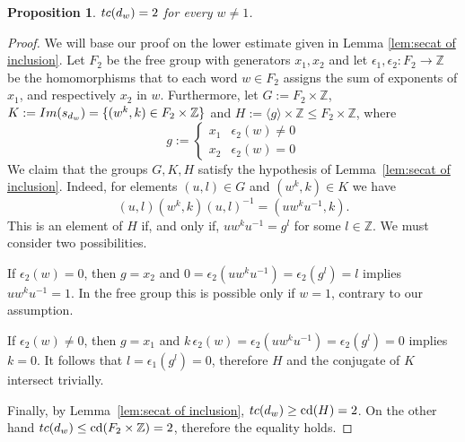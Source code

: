 \documentclass[10pt,a4paper]{amsart}
\newtheorem{proposition}{Proposition}
\newcommand{\ZZ}{{\mathbb{Z}}}
\newcommand{\cd}{\mathrm{cd}}
\newcommand{\im}{\mathop{\rm Im}\nolimits}
\newcommand{\tc}{\mathop{\rm tc}\nolimits}
\begin{document}
\begin{proposition}\label{prop:ex free by Z}
$\tc(d_w)=2$ for every $w\ne 1$.
\end{proposition}

\begin{proof}
We will base our proof on the lower estimate given in Lemma \ref{lem:secat of inclusion}.
Let $F_2$ be the free group with generators $x_1,x_2$ and let 
$\epsilon_1,\epsilon_2\colon F_2\to\ZZ$ be the homomorphisms that to each word 
$w\in F_2$ assigns the sum of exponents of $x_1$, and respectively $x_2$ in $w$.
Furthermore, let $G:=F_2\times\ZZ$, $K:=\im(s_{d_w})=\{(w^k,k)\in F_2\times\ZZ\}$ and 
$H:=\langle g\rangle \times \ZZ\le F_2\times \ZZ$, where 
$$g:=\left\{\begin{array}{ll}
x_1  & \epsilon_2(w)\ne 0 \\
x_2  & \epsilon_2(w)=0
\end{array}\right.$$
We claim that the groups $G,K,H$ satisfy the hypothesis of Lemma~\ref{lem:secat of inclusion}. 
Indeed, for elements $(u,l)\in G$ and $(w^k,k)\in K$ we have
$$(u,l)(w^k,k)(u,l)^{-1}=(uw^ku^{-1},k).$$
This is an element of $H$ if, and only if, $uw^ku^{-1}=g^l$ for some $l\in\ZZ$. 
We must consider two possibilities.

If $\epsilon_2(w)=0$, then $g=x_2$ and 
$0=\epsilon_2(uw^ku^{-1})=\epsilon_2(g^l)=l$ implies $uw^k u^{-1}=1$. In the free group
this is possible only if $w=1$, contrary to our assumption. 

If $\epsilon_2(w)\ne 0$, then $g=x_1$ and 
$k\,\epsilon_2(w)=\epsilon_2(uw^ku^{-1})=\epsilon_2(g^l)=0$ implies $k=0$. 
It follows that $l=\epsilon_1(g^l)=0$, 
therefore $H$ and the conjugate of $K$ intersect trivially. 

Finally, by Lemma~\ref{lem:secat of inclusion}, $\tc(d_w)\ge\cd(H)=2$. 
On the other hand $\tc(d_w)\le\cd(F_2\times \ZZ)=2$, therefore the equality holds.
\end{proof}
\end{document}
